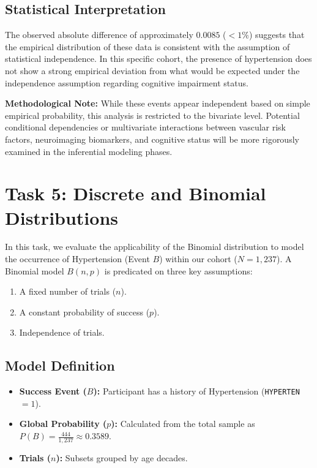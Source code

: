 \documentclass[11pt, a4paper]{article}
\begin{document}
\subsection{Statistical Interpretation}
The observed absolute difference of approximately $0.0085$ ($< 1\%$) suggests that the empirical distribution of these data is consistent with the assumption of statistical independence. In this specific cohort, the presence of hypertension does not show a strong empirical deviation from what would be expected under the independence assumption regarding cognitive impairment status.

\textbf{Methodological Note:} While these events appear independent based on simple empirical probability, this analysis is restricted to the bivariate level. Potential conditional dependencies or multivariate interactions between vascular risk factors, neuroimaging biomarkers, and cognitive status will be more rigorously examined in the inferential modeling phases.

\section{Task 5: Discrete and Binomial Distributions}
In this task, we evaluate the applicability of the Binomial distribution to model the occurrence of Hypertension (Event $B$) within our cohort ($N = 1,237$). A Binomial model $B(n, p)$ is predicated on three key assumptions:
\begin{enumerate}
    \item A fixed number of trials ($n$).
    \item A constant probability of success ($p$).
    \item Independence of trials.
\end{enumerate}

\subsection{Model Definition}
\begin{itemize}
    \item \textbf{Success Event ($B$):} Participant has a history of Hypertension (\texttt{HYPERTEN} $= 1$).
    \item \textbf{Global Probability ($p$):} Calculated from the total sample as $P(B) = \frac{444}{1,237} \approx 0.3589$.
    \item \textbf{Trials ($n$):} Subsets grouped by age decades.
\end{itemize}
\end{document}
